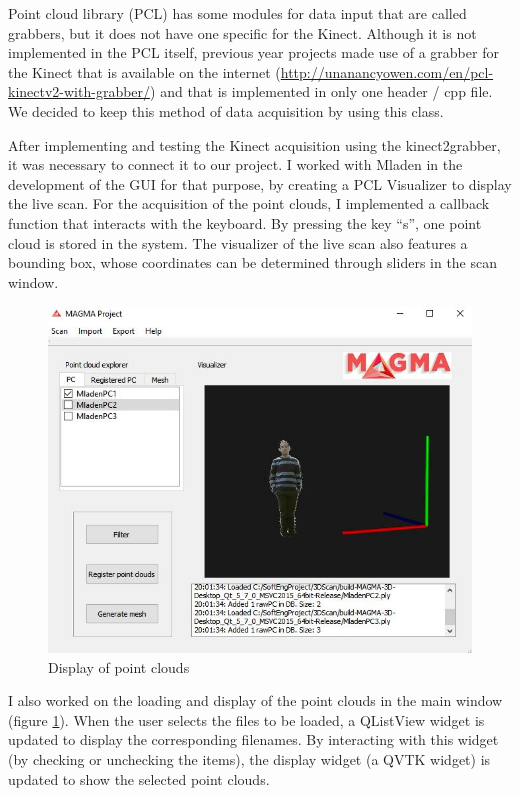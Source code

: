 \documentclass[aps,letterpaper,11pt]{revtex4}
\begin{document}
Point cloud library (PCL) has some modules for data input that are called grabbers, but it does not have one specific for the Kinect. Although it is not implemented in the PCL itself, previous year projects made use of a grabber for the Kinect that is available on the internet (\url{http://unanancyowen.com/en/pcl-kinectv2-with-grabber/}) and that is implemented in only one header / cpp file. We decided to keep this method of data acquisition by using this class.\par
After implementing and testing the Kinect acquisition using the kinect2grabber, it was necessary to connect it to our project. I worked with Mladen in the development of the GUI for that purpose, by creating a PCL Visualizer to display the live scan. For the acquisition of the point clouds, I implemented a callback function that interacts with the keyboard. By pressing the key “s”, one point cloud is stored in the system. The visualizer of the live scan also features a bounding box, whose coordinates can be determined through sliders in the scan window.\par
\begin{figure}[h]
\includegraphics[scale=0.5]{PC_display}
\caption{Display of point clouds}
\label{fig:PCdisp}
\end{figure}
I also worked on the loading and display of the point clouds in the main window (figure \ref {fig:PCdisp}). When the user selects the files to be loaded, a QListView widget is updated to display the corresponding filenames. By interacting with this widget (by checking or unchecking the items), the display widget (a QVTK widget) is updated to show the selected point clouds.\par
\end{document}
